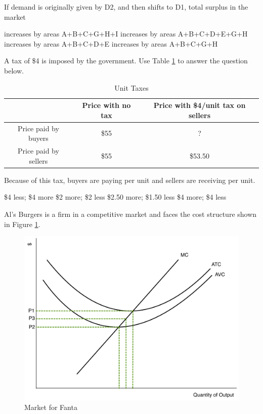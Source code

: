 \documentclass[addpoints,11pt]{exam}
\theoremstyle{definition}
\begin{document}
\begin{questions}
\newpage

If demand is originally given by D2, and then shifts to D1, total surplus in the market

\begin{choices}
	\choice increases by areas A+B+C+G+H+I
	\choice increases by areas A+B+C+D+E+G+H
	\choice increases by areas A+B+C+D+E
	\CorrectChoice increases by areas A+B+C+G+H
\end{choices}



\question A tax of \$4 is imposed by the government. Use Table \ref{MC27} to answer the question below.

\begin{table}[h!]
	\caption{Unit Taxes}
	\centering
	\begin{tabular}{  c| c | c} 
		
		& Price with no tax & Price with \$4/unit tax on sellers \\
		\hline
		Price paid by buyers & \$55 & ? \\
		Price paid by sellers & \$55 & \$53.50  \\
	\end{tabular}
	\label{MC27}
\end{table}

Because of this tax, buyers are paying \underline{\hspace{3cm}} per unit and sellers are receiving \underline{\hspace{3cm}} per unit.

\begin{choices}
		\choice \$4 less; \$4 more
		\choice \$2 more; \$2 less
		\CorrectChoice \$2.50 more; \$1.50 less
		\choice \$4 more; \$4 less
\end{choices}


	
	\question Al's Burgers is a firm in a competitive market and faces the cost structure shown in Figure \ref{MC28}.
	
	\begin{figure}[H]
		\centering
		\includegraphics[scale=.40]{Exam1_MC27.pdf}
		\caption{Market for Fanta}
		\label{MC28}
	\end{figure}
	

\end{questions}
\end{document}
